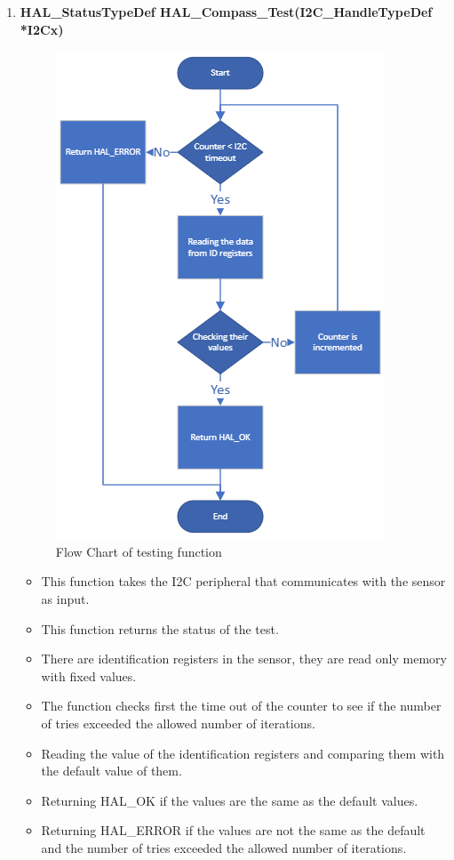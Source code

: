 \begin{enumerate}
    \clearpage
    \item \textbf{HAL\_StatusTypeDef HAL\_Compass\_Test(I2C\_HandleTypeDef *I2Cx)}
    \begin{figure}[h]
        \centering
        \includegraphics[scale=.6]{figures/8.png}
        \caption{Flow Chart of testing function}
    \end{figure}
    \begin{itemize}
        \item This function takes the I2C peripheral that communicates with the sensor as input.
        \item This function returns the status of the test.
        \item There are identification registers in the sensor, they are read only memory with fixed values.
        \item The function checks first the time out of the counter to see if the number of tries exceeded the allowed  number of iterations.
        \item Reading the value of the identification registers and comparing them with the default value of them.
        \item Returning HAL\_OK if the values are the same as the default values.
        \item Returning HAL\_ERROR if the values are not the same as the default and the number of tries exceeded the allowed number of iterations.
    \end{itemize}
\end{enumerate}
